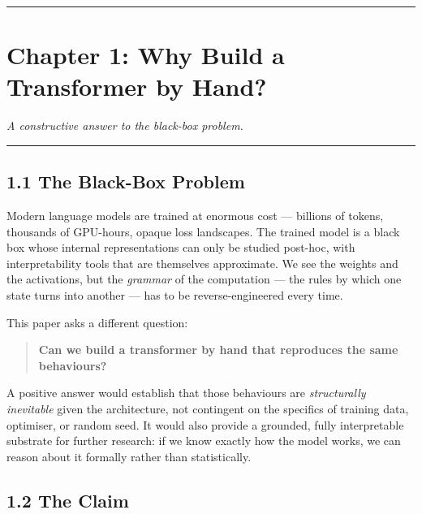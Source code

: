 \documentclass[
  twocolumn,
  10pt,
  a4paper]{article}
\begin{document}
\begin{center}\rule{0.5\linewidth}{0.5pt}\end{center}

\hypertarget{chapter-1-why-build-a-transformer-by-hand}{%
\FloatBarrier
\section{Chapter 1: Why Build a Transformer by
Hand?}\label{chapter-1-why-build-a-transformer-by-hand}}

\emph{A constructive answer to the black-box problem.}

\begin{center}\rule{0.5\linewidth}{0.5pt}\end{center}

\hypertarget{the-black-box-problem}{%
\subsection{1.1 The Black-Box Problem}\label{the-black-box-problem}}

Modern language models are trained at enormous cost --- billions of
tokens, thousands of GPU-hours, opaque loss landscapes. The trained
model is a black box whose internal representations can only be studied
post-hoc, with interpretability tools that are themselves approximate.
We see the weights and the activations, but the \emph{grammar} of the
computation --- the rules by which one state turns into another --- has
to be reverse-engineered every time.

This paper asks a different question:

\begin{quote}
\textbf{Can we build a transformer by hand that reproduces the same
behaviours?}
\end{quote}

A positive answer would establish that those behaviours are
\emph{structurally inevitable} given the architecture, not contingent on
the specifics of training data, optimiser, or random seed. It would also
provide a grounded, fully interpretable substrate for further research:
if we know exactly how the model works, we can reason about it formally
rather than statistically.

\hypertarget{the-claim}{%
\subsection{1.2 The Claim}\label{the-claim}}
\end{document}
